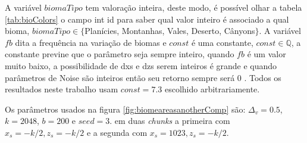 A variável $biomaTipo$ tem valoração inteira, deste modo, é possível olhar a tabela \ref{tab:bioColors}
o campo int id para saber qual valor inteiro é associado a qual bioma, $biomaTipo \in \{$Planícies, Montanhas, Vales, Deserto, Cânyons$\}$.
A variável $fb$ dita a frequência na variação de biomas e $const$ é uma constante,
$const \in \mathbb{Q}$, a constante previne que o parâmetro seja sempre inteiro, quando $fb$ é um valor muito baixo,
a possibilidade de dxs e dzs serem inteiros é grande e quando parâmetros de Noise 
são inteiros então seu retorno sempre será $0$ \cite{perlin1985image}. Todos os resultados 
neste trabalho usam $const = 7.3$ escolhido arbitrariamente.

Os parâmetros usados na figura \ref{fig:biomeareasanotherComp} são: $\Delta_{v} = 0.5$, 
$k = 2048$, $b = 200$ e $seed = 3$. em duas \textit{chunks} a primeira com $ x_{s} = -k/2 , z_{s} = -k/2$
e a segunda com $ x_{s} = 1023 , z_{s} = -k/2$.

